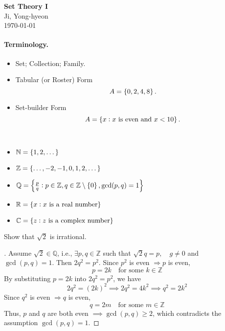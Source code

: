 \documentclass[11pt,openany]{article}
\begin{document}
\begin{center}
	\huge\textbf{Set Theory I}\\
	\vspace{0.5em}
	\large{Ji, Yong-hyeon}\\
	\vspace{0.5em}
	\normalsize{\today}\\
\end{center}

\paragraph*{Terminology.}

\begin{itemize}
	\item Set; Collection; Family.
	\item Tabular (or Roster) Form \[
	A=\set{0,2,4,8}.
	\]
	\item Set-builder Form \[
	A=\set{x:x\ \text{is even and}\ x <10}.
	\]
\end{itemize}

\begin{example*}
	\ \begin{itemize}
		\item $\mathbb{N}=\set{1,2,\dots}$
		\item $\mathbb{Z}=\set{\dots,-2,-1,0,1,2,\dots}$
		\item $\mathbb{Q}=\set{\frac{p}{q}:p\in\mathbb{Z},q\in\mathbb{Z}\setminus\set{0}, \gcd(p,q)=1}$
		\item $\mathbb{R}=\set{x: x\ \text{is a real number}}$
		\item $\mathbb{C}=\set{z:z\ \text{is a complex number}}$
	\end{itemize}
\end{example*}
\vfill
\begin{exercise*}
	Show that $\sqrt{2}$ is irrational.
	\begin{proof}[\sol]
		\textcolor{gray!50!white}{Assume \( \sqrt{2} \in \mathbb{Q} \), i.e., \( \exists p, q \in \mathbb{Z} \) such that
		$\sqrt{2}q = p, \quad g\neq 0$ and $\gcd(p, q) = 1.$
		Then $2q^2 = p^2$. Since \( p^2 \) is even \( \Rightarrow p \) is even,
		\[
		p = 2k \quad \text{for some } k \in \mathbb{Z}
		\]
		By substituting \( p = 2k \) into \( 2q^2 = p^2 \), we have
		\[
		2q^2 = (2k)^2 \implies 2q^2 = 4k^2 \implies q^2 = 2k^2
		\]
		Since \( q^2 \) is even \( \Rightarrow q \) is even,
		\[
		q = 2m \quad \text{for some } m \in \mathbb{Z}
		\]
		Thus, \( p \) and \( q \) are both even \( \implies \gcd(p, q) \geq 2 \), which contradicts the assumption \( \gcd(p, q) = 1 \).}
	\end{proof}
\end{exercise*}
\end{document}
